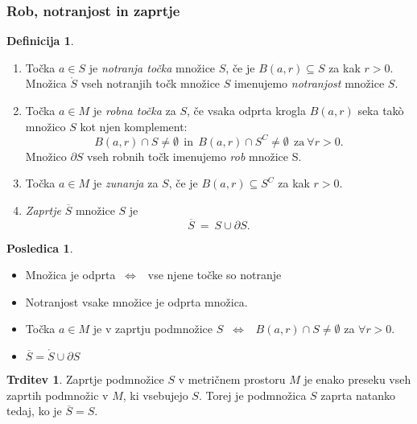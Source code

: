 \documentclass[11pt]{article}
\theoremstyle{definition}
\newtheorem{definicija}{Definicija}[section]
\theoremstyle{definition}
\newtheorem{trditev}{Trditev}[section]
\theoremstyle{definition}
\newtheorem*{posledica}{Posledica}
\begin{document}
\subsubsection{Rob, notranjost in zaprtje}
\vspace{0.5cm}

\begin{definicija}
~
\begin{enumerate}
	\item Točka $a \in S$ je \textit{notranja točka} množice $S$, če je $B(a, r) \subseteq S$ za kak $r > 0$. Množica $\mathring{S}$ vseh notranjih točk množice $S$ imenujemo \textit{notranjost} množice $S$.
	\item Točka $a \in M$ je \textit{robna točka} za $S$, če vsaka odprta krogla $B(a, r)$ seka takò množico $S$ kot njen komplement:
	$$B(a, r) \cap S \neq \emptyset ~~\text{in}~~ B(a, r) \cap S^C \neq \emptyset ~~\text{za}~ \forall r > 0.$$
	Množico $\partial S$ vseh robnih točk imenujemo \textit{rob} množice S.
	\item Točka $a \in M$ je \textit{zunanja} za $S$, če je $B(a, r) \subseteq S^C$ za kak $r > 0$.
	\item \textit{Zaprtje} $\overline{S}$ množice $S$ je 
	$$\overline{S} ~=~ S \cup \partial S.$$
\end{enumerate}

\end{definicija}
\vspace{0.5cm}

\begin{posledica}
~
\begin{itemize}
	\item Množica je odprta $~\iff~~$ vse njene točke so notranje
	\item Notranjost vsake množice je odprta množica.
	\item Točka $a \in M$ je v zaprtju podmnožice $S$ $~\iff~~$ $B(a, r) \cap S \neq \emptyset$ za $\forall r > 0$.
	\item $\overline{S} = \mathring{S} \cup \partial S$
\end{itemize}

\end{posledica}
\vspace{0.5cm}

\begin{trditev}

Zaprtje podmnožice $S$ v metričnem prostoru $M$ je enako preseku vseh zaprtih podmnožic v $M$, ki vsebujejo $S$. Torej je podmnožica $S$ zaprta natanko tedaj, ko je $\overline{S} = S$.

\end{trditev}
\vspace{0.5cm}
\end{document}
